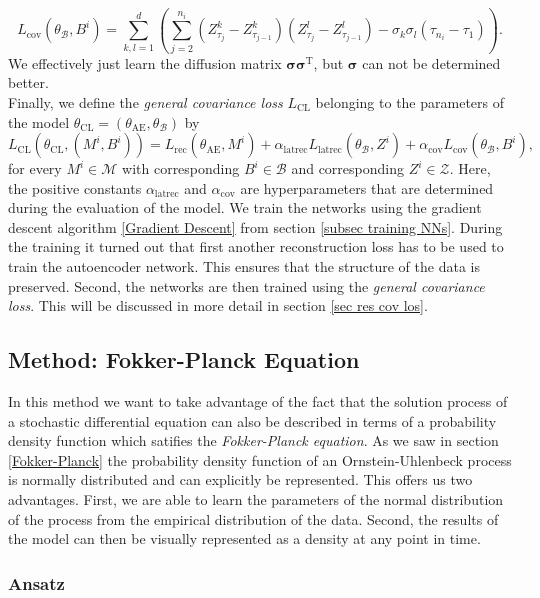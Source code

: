 \documentclass[11pt,titlepage]{article}
\theoremstyle{definition}
\theoremstyle{remark}
\begin{document}
	\[L_\mathrm{cov}(\theta_\mathcal{B}, B^i) = \sum_{k,l=1}^d \left(\sum_{j=2}^{n_i} \left(Z^k_{\tau_{j}}-Z^k_{\tau_{j-1}}\right)\left(Z^l_{\tau_{j}}-Z^l_{\tau_{j-1}}\right)-\sigma_k\sigma_l(\tau_{n_i}-\tau_1)\right).\]
	We effectively just learn the diffusion matrix $\boldsymbol{\sigma} \boldsymbol{\sigma}^\text{T}$, but $\boldsymbol{\sigma}$ can not be determined better. \\
	Finally, we define the \textsl{general covariance loss} $L_\mathrm{CL}$ belonging to the parameters of the model $\theta_\mathrm{CL} = (\theta_\mathrm{AE},\theta_\mathcal{B})$ by
	\[L_\mathrm{CL}(\theta_\mathrm{CL}, (M^i, B^i)) = L_\mathrm{rec}(\theta_{\mathrm{AE}}, M^i) + \alpha_\mathrm{latrec} L_\mathrm{latrec}(\theta_\mathcal{B}, Z^i) + \alpha_\mathrm{cov}L_\mathrm{cov}(\theta_\mathcal{B}, B^i),\]
	for every $M^i\in\mathcal{M}$ with corresponding $B^i\in\mathcal{B}$ and corresponding $Z^i\in\mathcal{Z}$. Here, the positive constants $\alpha_\mathrm{latrec}$ and $\alpha_\mathrm{cov}$ are hyperparameters that are determined during the evaluation of the model. We train the networks using the gradient descent algorithm \ref{Gradient Descent} from section \ref{subsec training NNs}. During the training it turned out that first another reconstruction loss has to be used to train the autoencoder network. This ensures that the structure of the data is preserved. Second, the networks are then trained using the  \textsl{general covariance loss}. This will be discussed in more detail in section \ref{sec res cov los}.
	
	\clearpage
	\subsection{Method: Fokker-Planck Equation}\label{sec Method Fokker-Planck}
	
	In this method we want to take advantage of the fact that the solution process of a 
	stochastic differential equation can also be described in terms of a probability 
	density function which satifies the \textsl{Fokker-Planck equation}. 
	As we saw in section \ref{Fokker-Planck} the probability density function of an Ornstein-Uhlenbeck process is 
	normally distributed and can explicitly be represented. This offers us two advantages. First, we are able to learn the parameters of the normal distribution of the process from the empirical distribution of the data. Second, the results of the model can then be visually represented as a density at any point in time.
	
	\subsubsection*{Ansatz}
	
\end{document}
